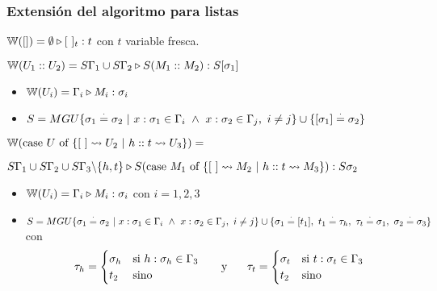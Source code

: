 \subsubsection{Extensión del algoritmo para listas}
$\mathbb{W}([]) = \emptyset\triangleright [~]_{t} : t$ con $t$ variable fresca.

$\mathbb{W}(U_1::U_2) = S\Gamma_1\cup S\Gamma_2\triangleright S(M_1::M_2) : S[\sigma_1]$

\begin{centrado}
\begin{itemize}
    \item $\mathbb{W}(U_i) = \Gamma_i\triangleright M_i : \sigma_i$
    \item $S = MGU\{\sigma_1\overset{\cdot}{=} \sigma_2~|~x:\sigma_1\in\Gamma_i~\land~x:\sigma_2\in\Gamma_j,~i\neq j\}\cup\{[\sigma_1]\overset{\cdot}{=}\sigma_2\} $
\end{itemize}
\end{centrado}


$\mathbb{W}(\text{case } U \text{ of } \{[~]\leadsto U_2~|~h::t\leadsto U_3\}) =$
 
\quad$S\Gamma_1\cup S\Gamma_2\cup S\Gamma_3\backslash\{h,t\}\triangleright S(\text{case } M_1 \text{ of } \{[~]\leadsto M_2~|~h::t\leadsto M_3\}) : S\sigma_2$

\begin{centrado}
\begin{itemize}
    \item $\mathbb{W}(U_i) = \Gamma_i\triangleright M_i : \sigma_i$ con $i = 1,2,3$
    \item $S = MGU\{\sigma_1\overset{\cdot}{=} \sigma_2~|~x:\sigma_1\in\Gamma_i~\land~x:\sigma_2\in\Gamma_j,~i\neq j\}\cup\{\sigma_1\overset{\cdot}{=} [t_1],~t_1\overset{\cdot}{=} \tau_h,~\tau_t\overset{\cdot}{=} \sigma_1,~\sigma_2\overset{\cdot}{=}\sigma_3\} $ con 
\[ \tau_h = \begin{cases} 
      \sigma_h & \text{si } h:\sigma_h\in\Gamma_3 \\
      t_2 & \text{sino} \\
   \end{cases} \hspace*{5mm}\text{ y }\hspace*{5mm}
    \tau_t = \begin{cases} 
         \sigma_t & \text{si } t:\sigma_t\in\Gamma_3 \\
         t_2 & \text{sino} \\
      \end{cases}
\]
\end{itemize}
\end{centrado}





